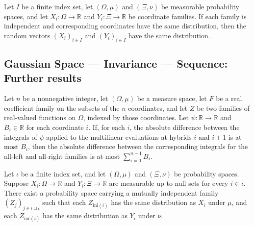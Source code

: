 \begin{theorem}
\leanok
{}
Let $I$ be a finite index set, let $(\Omega,\mu)$ and $(\Xi,\nu)$ be measurable
probability spaces, and let $X_i:\Omega\to\mathbb R$ and $Y_i:\Xi\to\mathbb R$ be
coordinate families. If each family is independent and corresponding coordinates have
the same distribution, then the random vectors $(X_i)_{i\in I}$ and $(Y_i)_{i\in I}$
have the same distribution.
\end{theorem}

\subsection*{Gaussian Space --- Invariance --- Sequence: Further results}

\begin{theorem}
\label{BooleanAnalysis.GaussianSpace.Invariance.hybrid_expectation_bound}
\leanok
{}
Let $n$ be a nonnegative integer, let $(\Omega,\mu)$ be a measure space, let $F$ be a
real coefficient family on the subsets of the $n$ coordinates, and let $Z$ be two
families of real-valued functions on $\Omega$, indexed by those coordinates. Let
$\psi:\mathbb R\to\mathbb R$ and $B_i\in\mathbb R$ for each coordinate $i$. If, for each
$i$, the absolute difference between the integrals of $\psi$ applied to the multilinear
evaluations at hybrids $i$ and $i+1$ is at most $B_i$, then the absolute difference
between the corresponding integrals for the all-left and all-right families is at most
$\sum_{i=0}^{n-1}B_i$.
\end{theorem}

\begin{theorem}
\label{BooleanAnalysis.GaussianSpace.Invariance.independent_input_coupling}
\leanok
{}
Let $\iota$ be a finite index set, and let $(\Omega,\mu)$ and $(\Xi,\nu)$ be probability
spaces. Suppose $X_i:\Omega\to\mathbb R$ and $Y_i:\Xi\to\mathbb R$ are measurable up to
null sets for every $i\in\iota$. There exist a probability space carrying a mutually
independent family $(Z_j)_{j\in\iota\sqcup\iota}$ such that each $Z_{\mathrm{inl}(i)}$
has the same distribution as $X_i$ under $\mu$, and each $Z_{\mathrm{inr}(i)}$ has the
same distribution as $Y_i$ under $\nu$.
\end{theorem}

